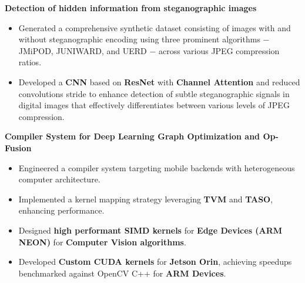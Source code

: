 \documentclass[10pt,a4]{article}
\begin{document}
{\begin{flushleft}
        \item \textbf{\large Detection of hidden information from steganographic images}
        \begin{itemize}
            \item Generated a comprehensive synthetic dataset consisting of images with and without steganographic encoding using three prominent algorithms $-$ JMiPOD, JUNIWARD, and UERD $-$ across various JPEG compression ratios.
            \item Developed a \textbf{CNN} based on \textbf{ResNet} with \textbf{Channel Attention} and reduced convolutions stride to enhance detection of subtle steganographic signals in digital images that effectively differentiates between various levels of JPEG compression.

        \end{itemize}

        \item \textbf{\large Compiler System for Deep Learning Graph Optimization and Op-Fusion}
        \begin{itemize}
            \item Engineered a compiler system targeting mobile backends with heterogeneous computer architecture.
            \item Implemented a kernel mapping strategy leveraging \textbf{TVM} and \textbf{TASO}, enhancing performance.
            \item Designed \textbf{high performant SIMD kernels} for \textbf{Edge Devices (ARM NEON)} for \textbf{Computer Vision algorithms}.
            \item Developed \textbf{Custom CUDA kernels} for \textbf{Jetson Orin}, achieving speedups benchmarked against OpenCV C++ for \textbf{ARM Devices}.
        \end{itemize}


\end{flushleft}}
\end{document}
